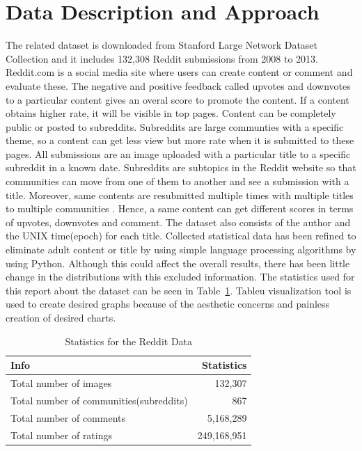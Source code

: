 \documentclass[a4paper]{article}
\begin{document}
\section{Data Description and Approach}
The related dataset is downloaded from Stanford Large Network Dataset Collection and it includes 132,308 Reddit submissions from 2008 to 2013. Reddit.com is a social media site where users can create content or comment and evaluate these. The negative and positive feedback called upvotes and downvotes to a particular content gives an overal score to promote the content. If a content obtains higher rate, it will be visible in top pages. Content can be completely public or posted to subreddits. Subreddits are large communties with a specific theme, so a content can get less view but more rate when it is submitted to these pages. All submissions are an image uploaded with a particular title to a specific subreddit in a known date. Subreddits are subtopics in the Reddit website so that communities can move from one of them to another and see a submission with a title. Moreover, same contents are resubmitted multiple times with multiple titles to multiple communities \cite{dataset}. Hence, a same content can get different scores in terms of upvotes, downvotes and comment. The dataset also consists of the author and the UNIX time(epoch) for each title.
Collected statistical data has been refined to eliminate adult content or title by using simple language processing algorithms by using Python. Although this could affect the overall results, there has been little change in the distributions with this excluded information. The statistics used for this report about the dataset can be seen in Table~\ref{table:dataset}. Tableu visualization tool is used to create desired graphs because of the aesthetic concerns and painless creation of desired charts.   
\begin{table}
\centering
\begin{tabular}{l|r}
Info & Statistics \\\hline
Total number of images  & 132,307 \\
Total number of communities(subreddits) & 867 \\
Total number of comments &5,168,289 \\
Total number of ratings & 249,168,951
\end{tabular}
\caption{\label{table:dataset}Statistics for the Reddit Data}
\end{table}
\end{document}
